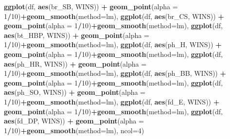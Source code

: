 \documentclass[]{article}
\newenvironment{Shaded}{\begin{snugshade}}{\end{snugshade}}
\newcommand{\DataTypeTok}[1]{\textcolor[rgb]{0.13,0.29,0.53}{#1}}
\newcommand{\DecValTok}[1]{\textcolor[rgb]{0.00,0.00,0.81}{#1}}
\newcommand{\KeywordTok}[1]{\textcolor[rgb]{0.13,0.29,0.53}{\textbf{#1}}}
\newcommand{\NormalTok}[1]{#1}
\newcommand{\OperatorTok}[1]{\textcolor[rgb]{0.81,0.36,0.00}{\textbf{#1}}}
\newcommand{\StringTok}[1]{\textcolor[rgb]{0.31,0.60,0.02}{#1}}
\begin{document}
\begin{Shaded}
\begin{Highlighting}[]
             \KeywordTok{ggplot}\NormalTok{(df, }\KeywordTok{aes}\NormalTok{(br_SB, WINS)) }\OperatorTok{+}\StringTok{ }\KeywordTok{geom_point}\NormalTok{(}\DataTypeTok{alpha =} \DecValTok{1}\OperatorTok{/}\DecValTok{10}\NormalTok{)}\OperatorTok{+}\KeywordTok{geom_smooth}\NormalTok{(}\DataTypeTok{method=}\NormalTok{lm),}
             \KeywordTok{ggplot}\NormalTok{(df, }\KeywordTok{aes}\NormalTok{(br_CS, WINS)) }\OperatorTok{+}\StringTok{ }\KeywordTok{geom_point}\NormalTok{(}\DataTypeTok{alpha =} \DecValTok{1}\OperatorTok{/}\DecValTok{10}\NormalTok{)}\OperatorTok{+}\KeywordTok{geom_smooth}\NormalTok{(}\DataTypeTok{method=}\NormalTok{lm),}
             \KeywordTok{ggplot}\NormalTok{(df, }\KeywordTok{aes}\NormalTok{(bt_HBP, WINS)) }\OperatorTok{+}\StringTok{ }\KeywordTok{geom_point}\NormalTok{(}\DataTypeTok{alpha =} \DecValTok{1}\OperatorTok{/}\DecValTok{10}\NormalTok{)}\OperatorTok{+}\KeywordTok{geom_smooth}\NormalTok{(}\DataTypeTok{method=}\NormalTok{lm),}
             \KeywordTok{ggplot}\NormalTok{(df, }\KeywordTok{aes}\NormalTok{(ph_H, WINS)) }\OperatorTok{+}\StringTok{ }\KeywordTok{geom_point}\NormalTok{(}\DataTypeTok{alpha =} \DecValTok{1}\OperatorTok{/}\DecValTok{10}\NormalTok{)}\OperatorTok{+}\KeywordTok{geom_smooth}\NormalTok{(}\DataTypeTok{method=}\NormalTok{lm),}
             \KeywordTok{ggplot}\NormalTok{(df, }\KeywordTok{aes}\NormalTok{(ph_HR, WINS)) }\OperatorTok{+}\StringTok{ }\KeywordTok{geom_point}\NormalTok{(}\DataTypeTok{alpha =} \DecValTok{1}\OperatorTok{/}\DecValTok{10}\NormalTok{)}\OperatorTok{+}\KeywordTok{geom_smooth}\NormalTok{(}\DataTypeTok{method=}\NormalTok{lm),}
             \KeywordTok{ggplot}\NormalTok{(df, }\KeywordTok{aes}\NormalTok{(ph_BB, WINS)) }\OperatorTok{+}\StringTok{ }\KeywordTok{geom_point}\NormalTok{(}\DataTypeTok{alpha =} \DecValTok{1}\OperatorTok{/}\DecValTok{10}\NormalTok{)}\OperatorTok{+}\KeywordTok{geom_smooth}\NormalTok{(}\DataTypeTok{method=}\NormalTok{lm),}
             \KeywordTok{ggplot}\NormalTok{(df, }\KeywordTok{aes}\NormalTok{(ph_SO, WINS)) }\OperatorTok{+}\StringTok{ }\KeywordTok{geom_point}\NormalTok{(}\DataTypeTok{alpha =} \DecValTok{1}\OperatorTok{/}\DecValTok{10}\NormalTok{)}\OperatorTok{+}\KeywordTok{geom_smooth}\NormalTok{(}\DataTypeTok{method=}\NormalTok{lm),}
             \KeywordTok{ggplot}\NormalTok{(df, }\KeywordTok{aes}\NormalTok{(fd_E, WINS)) }\OperatorTok{+}\StringTok{ }\KeywordTok{geom_point}\NormalTok{(}\DataTypeTok{alpha =} \DecValTok{1}\OperatorTok{/}\DecValTok{10}\NormalTok{)}\OperatorTok{+}\KeywordTok{geom_smooth}\NormalTok{(}\DataTypeTok{method=}\NormalTok{lm),}
             \KeywordTok{ggplot}\NormalTok{(df, }\KeywordTok{aes}\NormalTok{(fd_DP, WINS)) }\OperatorTok{+}\StringTok{ }\KeywordTok{geom_point}\NormalTok{(}\DataTypeTok{alpha =} \DecValTok{1}\OperatorTok{/}\DecValTok{10}\NormalTok{)}\OperatorTok{+}\KeywordTok{geom_smooth}\NormalTok{(}\DataTypeTok{method=}\NormalTok{lm),}
             \DataTypeTok{ncol=}\DecValTok{4}\NormalTok{)}
\end{Highlighting}
\end{Shaded}
\end{document}
